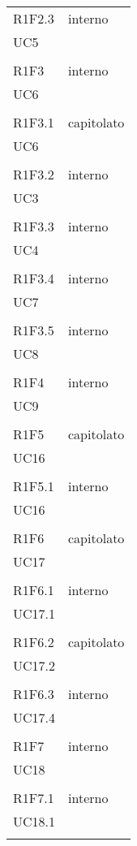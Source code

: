 \begin{longtable}{ >{\centering}p{}
		>{\centering}p{}}
	R1F2.3 & interno\\UC5\\\tabularnewline
	
	R1F3 & interno\\UC6\\\tabularnewline
	
	R1F3.1 & capitolato\\UC6\\\tabularnewline
	
	R1F3.2 & interno\\UC3\\\tabularnewline
	
	R1F3.3 & interno\\UC4\\\tabularnewline
	
	R1F3.4 & interno\\UC7\\\tabularnewline
	
	R1F3.5 & interno\\UC8\\\tabularnewline
	
	R1F4 & interno\\UC9\\\tabularnewline
	
	R1F5 & capitolato\\UC16\\\tabularnewline
	
	R1F5.1 & interno\\UC16\\\tabularnewline
	
	R1F6 & capitolato\\UC17\\\tabularnewline
	
	R1F6.1 & interno\\UC17.1\\\tabularnewline
	
	R1F6.2 & capitolato\\UC17.2\\\tabularnewline
	
	R1F6.3 & interno\\UC17.4\\\tabularnewline
	
	R1F7 & interno\\UC18\\\tabularnewline
	
	R1F7.1 & interno\\UC18.1\\\tabularnewline
	

\end{longtable}
